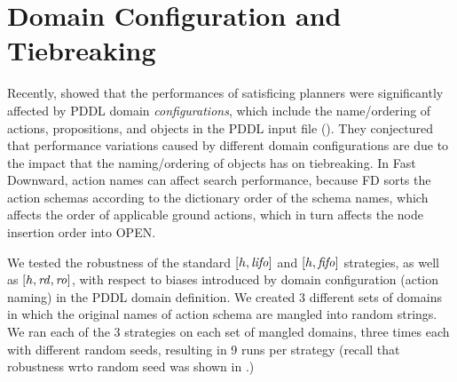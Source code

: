 \section{Domain Configuration and Tiebreaking}
Recently, \citeauthor{vallati2015effective} showed that the performances of 
satisficing planners were significantly affected by PDDL domain \emph{configurations}, which include the name/ordering of actions, propositions, and objects in the PDDL input file (\citeyear{vallati2015effective}).
They conjectured that performance variations caused
by different domain configurations are due to the impact that the naming/ordering of objects has on tiebreaking.
In Fast Downward, action names can affect search performance, because FD 
sorts the action schemas according to the dictionary
order of the schema names, which affects the order of applicable ground
actions, which in turn affects the node insertion order into OPEN.


We tested the robustness of the standard $[h,{\mbox{\textit{lifo}}}]$ and $[h,{\mbox{\textit{fifo}}}]$ strategies, as well as $[h,{\mbox{\textit{rd}}},{\mbox{\textit{ro}}}]$,
with respect to 
biases introduced by domain configuration (action naming) in the PDDL domain definition.
We created 3 different sets of domains in which the
original names of action schema are mangled into random strings. 
We ran each of the 3 strategies on each
set of mangled domains, three times each with different random seeds,
resulting in 9 runs per strategy (recall that robustness wrto random seed was shown in .)

